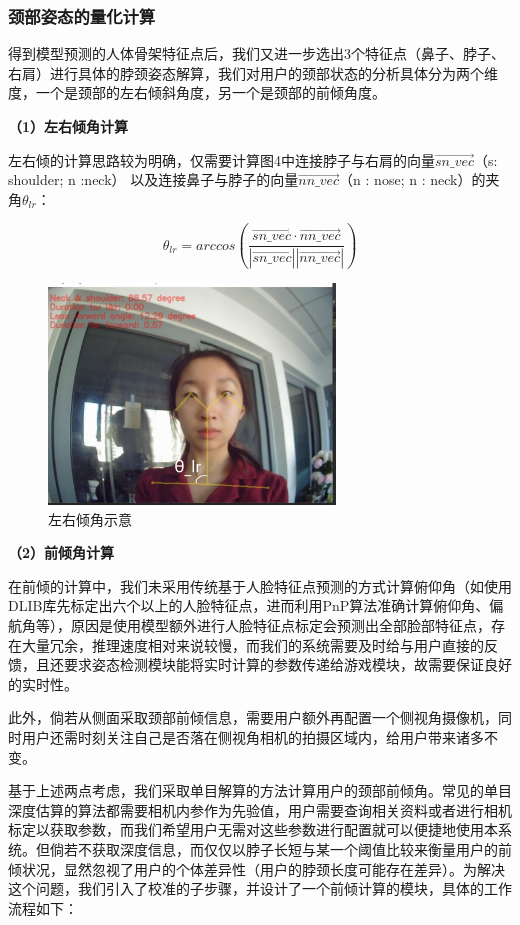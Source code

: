 \documentclass[12pt,a4paper]{article}%
\begin{document}
\subsubsection{颈部姿态的量化计算}
得到模型预测的人体骨架特征点后，我们又进一步选出3个特征点（鼻子、脖子、右肩）进行具体的脖颈姿态解算，我们对用户的颈部状态的分析具体分为两个维度，一个是颈部的左右倾斜角度，另一个是颈部的前倾角度。

\textbf{（1）左右倾角计算}

左右倾的计算思路较为明确，仅需要计算图4中连接脖子与右肩的向量\(\overrightarrow{sn\_vec}\)（s: shoulder; n :neck）
以及连接鼻子与脖子的向量\(\overrightarrow{nn\_vec}\)（n : nose; n
: neck）的夹角\(\theta_{lr}\)：

\[\theta_{lr} = arccos(\frac{\overrightarrow{sn\_vec} \cdot \overrightarrow{nn\_vec}}{|\overrightarrow{sn\_vec}||\overrightarrow{nn\_vec}|})\]

\begin{figure}[H]
\centering
\includegraphics[width=3in]{./Part3-Design.pic/image-20230102154403505.png}
\caption{左右倾角示意}
\end{figure}

\textbf{（2）前倾角计算}
\par
在前倾的计算中，我们未采用传统基于人脸特征点预测的方式计算俯仰角（如使用DLIB库先标定出六个以上的人脸特征点，进而利用PnP算法准确计算俯仰角、偏航角等），原因是使用模型额外进行人脸特征点标定会预测出全部脸部特征点，存在大量冗余，推理速度相对来说较慢，而我们的系统需要及时给与用户直接的反馈，且还要求姿态检测模块能将实时计算的参数传递给游戏模块，故需要保证良好的实时性。
\par
此外，倘若从侧面采取颈部前倾信息，需要用户额外再配置一个侧视角摄像机，同时用户还需时刻关注自己是否落在侧视角相机的拍摄区域内，给用户带来诸多不变。
\par
基于上述两点考虑，我们采取单目解算的方法计算用户的颈部前倾角。常见的单目深度估算的算法都需要相机内参作为先验值，用户需要查询相关资料或者进行相机标定以获取参数，而我们希望用户无需对这些参数进行配置就可以便捷地使用本系统。但倘若不获取深度信息，而仅仅以脖子长短与某一个阈值比较来衡量用户的前倾状况，显然忽视了用户的个体差异性（用户的脖颈长度可能存在差异）。为解决这个问题，我们引入了校准的子步骤，并设计了一个前倾计算的模块，具体的工作流程如下：
\end{document}
